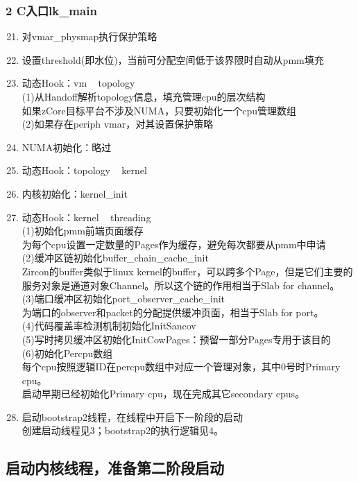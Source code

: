 \documentclass[
8pt, %
]{beamer}
\begin{document}
	\begin{frame}
		\frametitle{2 C入口lk\_main}
		\begin{enumerate}\setcounter{enumi}{20}
			\item 对vmar\_physmap执行保护策略
			\item 设置threshold(即水位)，当前可分配空间低于该界限时自动从pmm填充
			\item 动态Hook：vm ~ topology\\
			(1)从Handoff解析topology信息，填充管理cpu的层次结构\\
			如果zCore目标平台不涉及NUMA，只要初始化一个cpu管理数组\\
			(2)如果存在periph vmar，对其设置保护策略\\
			\item NUMA初始化：略过
			\item 动态Hook：topology ~ kernel
			\item 内核初始化：kernel\_init
			\item 动态Hook：kernel ~ threading\\
			(1)初始化pmm前端页面缓存\\
			为每个cpu设置一定数量的Pages作为缓存，避免每次都要从pmm中申请\\
			(2)缓冲区链初始化buffer\_chain\_cache\_init\\
			Zircon的buffer类似于linux kernel的buffer，可以跨多个Page，但是它们主要的服务对象是通道对象Channel。所以这个链的作用相当于Slab for channel。\\
			(3)端口缓冲区初始化port\_observer\_cache\_init\\
			为端口的observer和packet的分配提供缓冲页面，相当于Slab for port。\\
			(4)代码覆盖率检测机制初始化InitSancov\\
			(5)写时拷贝缓冲区初始化InitCowPages：预留一部分Pages专用于该目的\\
			(6)初始化Percpu数组\\
			每个cpu按照逻辑ID在percpu数组中对应一个管理对象，其中0号时Primary cpu。\\
			启动早期已经初始化Primary cpu，现在完成其它secondary cpus。
			\item 启动bootstrap2线程，在线程中开启下一阶段的启动\\
			创建启动线程见3；bootstrap2的执行逻辑见4。
		\end{enumerate}
	\end{frame}

	\subsection{启动内核线程，准备第二阶段启动}
	
\end{document}
